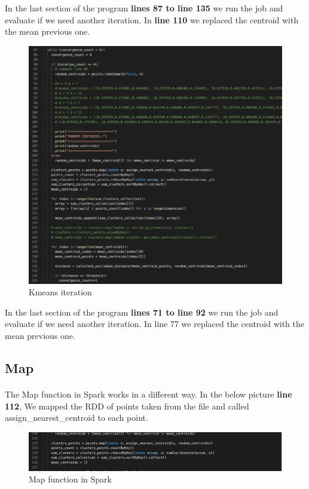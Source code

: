 \documentclass{book}
\begin{document}
	In the last section of the program \textbf{lines 87 to line 135} we run the job and evaluate if we need another iteration. In \textbf{line 110} we replaced the centroid with the mean previous one. 

    \begin{figure}[H]
        \includegraphics[width=12cm]{code/convergence_count}
        \centering
        \caption{Kmeans iteration}
    \end{figure}

    In the last section of the program \textbf{lines 71 to line 92} we run the job and evaluate if we need another iteration. In line 77 we replaced the centroid with the mean previous one. 

    \subsection{Map}
    \paragraph{}

    The Map function in Spark works in a different way. In the below picture \textbf{line 112}, We mapped the RDD of points taken from the file and called assign\_nearest\_centroid to each point. 

    \begin{figure}[H]
        \includegraphics[width=12cm]{code/random_centroids_small}
        \centering
        \caption{Map function in Spark}
    \end{figure}
\end{document}
